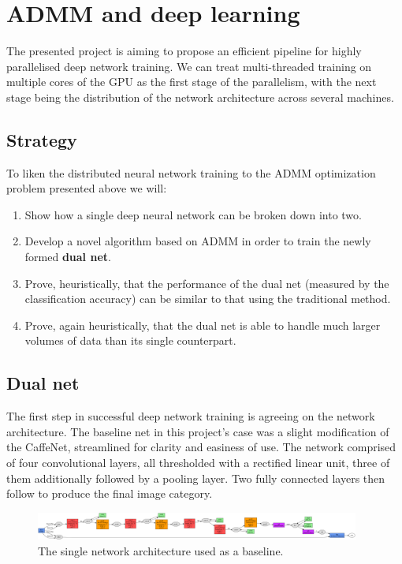 \documentclass[a4paper, 12pt]{article}
\numberwithin{equation}{section}
\begin{document}
	\section{ADMM and deep learning}
	
	The presented project is aiming to propose an efficient pipeline for highly parallelised deep network training. We can treat multi-threaded training on multiple cores of the GPU as the first stage of the parallelism, with the next stage being the distribution of the network architecture across several machines.
	
	\subsection{Strategy}
	
	To liken the distributed neural network training to the ADMM optimization problem presented above we will:
	\begin{enumerate}
		\item Show how a single deep neural network can be broken down into two.
		\item Develop a novel algorithm based on ADMM in order to train the newly formed \textbf{dual net}.
		\item Prove, heuristically, that the performance of the dual net (measured by the classification accuracy) can be similar to that using the traditional method.
		\item Prove, again heuristically, that the dual net is able to handle much larger volumes of data than its single counterpart.
	\end{enumerate}
	
	\subsection{Dual net}
	
	The first step in successful deep network training is agreeing on the network architecture. The baseline net in this project's case was a slight modification of the CaffeNet, streamlined for clarity and easiness of use. The network comprised of four convolutional layers, all thresholded with a rectified linear unit, three of them additionally followed by a pooling layer. Two fully connected layers then follow to produce the final image category.
	
	\begin{figure}[!h]
		\centering
		\includegraphics[page=1,width=0.95\textwidth]{net12.png}
		\caption{\label{fig:net12}{The single network architecture used as a baseline.}}
	\end{figure}
	
\end{document}
